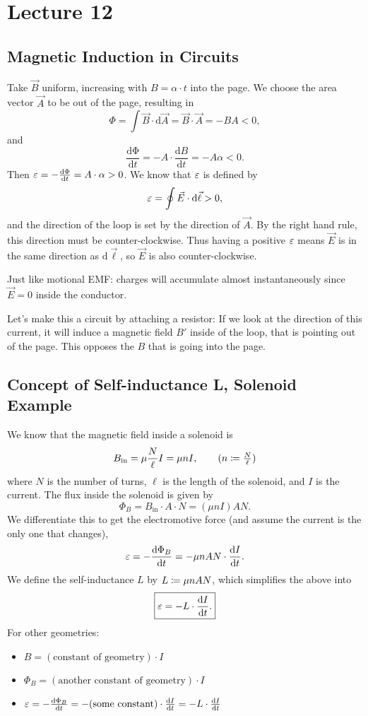 \documentclass[class=article, crop=false]{standalone}
\begin{document}
  \section{Lecture 12}
  \subsection{Magnetic Induction in Circuits}
  Take $\vec{B}$ uniform, increasing with $B = \alpha\cdot t$ into the page. We choose the area vector $\vec{A}$ to be out of the page, resulting in
  \[
    \Phi = \int \vec{B}\cdot \mathrm{d}\vec{A} = \vec{B}\cdot \vec{A} = -BA < 0,
  \]
  and
  \[
    \frac{\mathrm{d\Phi}}{\mathrm{d}t} = -A\cdot \frac{\mathrm{d}B}{\mathrm{d}t} = -A\alpha < 0.
  \]
  Then $\varepsilon = -\frac{\mathrm{d\Phi}}{\mathrm{d}t} = A\cdot \alpha > 0$. We know that $\varepsilon$ is defined by
  \[
    \varepsilon = \oint \vec{E}\cdot \mathrm{d}\vec{\ell} > 0,
  \]
  and the direction of the loop is set by the direction of $\vec{A}$. By the right hand rule, this direction must be counter-clockwise. Thus having a positive $\varepsilon$ means $\vec{E}$ is in the same direction as $\mathrm{d}\vec{\ell}$, so $\vec{E}$ is also counter-clockwise.
  \begin{note}{}
    Just like motional EMF: charges will accumulate almost instantaneously since $\vec{E} = 0$ inside the conductor.
  \end{note}
  Let's make this a circuit by attaching a resistor:
  If we look at the direction of this current, it will induce a magnetic field $B'$ inside of the loop, that is pointing out of the page. This opposes the $B$ that is going into the page.
  \subsection{Concept of Self-inductance L, Solenoid Example}
  We know that the magnetic field inside a solenoid is
  \[
    B_\text{in} = \mu \frac{N}{\ell}I = \mu nI, \tag{$n\ceq \frac{N}{\ell}$}
  \]
  where $N$ is the number of turns, $\ell$ is the length of the solenoid, and $I$ is the current. The flux inside the solenoid is given by
  \[
    \Phi_B = B_\text{in}\cdot A\cdot N = (\mu nI)AN.
  \]
  We differentiate this to get the electromotive force (and assume the current is the only one that changes), 
  \[
    \varepsilon = -\frac{\mathrm{d}\Phi_B}{\mathrm{d}t} = -\mu nAN\cdot \frac{\mathrm{d}I}{\mathrm{d}t}.
  \]
  We define the self-inductance $L$ by $L \coloneqq \mu nAN$, which simplifies the above into
  \[
    \boxed{\varepsilon = -L\cdot \frac{\mathrm{d}I}{\mathrm{d}t}.}
  \]
  For other geometries:
  \begin{itemize}
    \item $B = (\text{constant of geometry})\cdot I$
    \item $\Phi_B = (\text{another constant of geometry})\cdot I$
    \item $\varepsilon = -\frac{\mathrm{d}\Phi_B}{\mathrm{d}t} = -(\text{some constant})\cdot \frac{\mathrm{d}I}{\mathrm{d}t} = -L\cdot \frac{\mathrm{d}I}{\mathrm{d}t}$
  \end{itemize}
\end{document}
